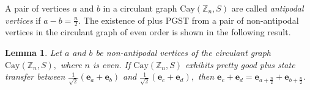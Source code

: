 \documentclass[12pt,a4paper]{article}
\newtheorem{lem}{Lemma}
\def \e {{\bf e}}
\def \e {{\mathbf e}}
\newcommand{\ob}[1]{\left(#1\right)}
\begin{document}
A pair of vertices $a$ and $b$ in a circulant graph $\text{Cay}(\mathbb{Z}_n, S)$ are called \emph{antipodal vertices} if $a-b=\frac{n}{2}.$ The existence of plus PGST from a pair of non-antipodal vertices in the circulant graph of even order is shown in the following result. 
\begin{lem}\label{5l9}
Let $a$ and $b$ be non-antipodal vertices of the circulant graph $\text{Cay}(\mathbb{Z}_n, S),$ where $n$ is even. If $\text{Cay}(\mathbb{Z}_n, S)$ exhibits pretty good plus state transfer between $\frac{1}{\sqrt{2}}\ob{\e_a+\e_b}$ and $\frac{1}{\sqrt{2}}\ob{\e_c+\e_d},$ then $\e_c+\e_d=\e_{a+\frac{n}{2}}+\e_{b+\frac{n}{2}}.$
\end{lem}
\end{document}
